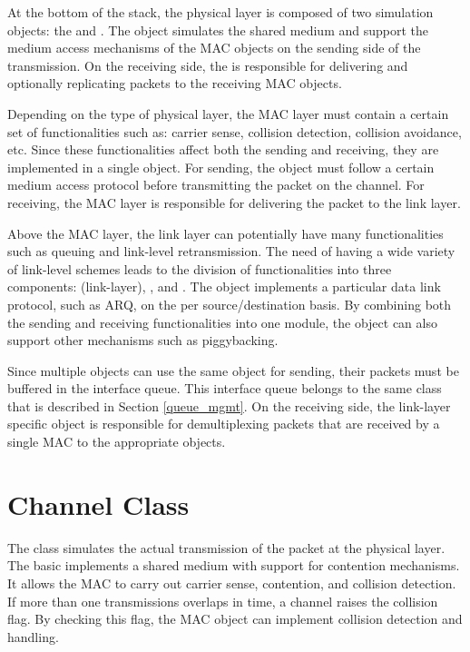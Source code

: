 At the bottom of the stack, the physical layer is composed of two
simulation objects: the  and .  The
 object simulates the shared medium and support the medium
access mechanisms of the MAC objects on the sending side of the
transmission.  On the receiving side, the  is
responsible for delivering and optionally replicating packets to the
receiving MAC objects.

Depending on the type of physical layer, the MAC layer must contain a
certain set of functionalities such as: carrier sense, collision
detection, collision avoidance, etc.  Since these functionalities affect
both the sending and receiving, they are implemented in a single
 object.  For sending, the  object must follow a certain
medium access protocol before transmitting the packet on the channel.
For receiving, the MAC layer is responsible for delivering the packet to
the link layer.

Above the MAC layer, the link layer can potentially have many
functionalities such as queuing and link-level retransmission.  The need
of having a wide variety of link-level schemes leads to the division of
functionalities into three components:  (link-layer),
, and .  The  object implements
a particular data link protocol, such as ARQ, on the per
source/destination basis.  By combining both the sending and receiving
functionalities into one module, the  object can also support
other mechanisms such as piggybacking.

Since multiple  objects can use the same  object for
sending, their packets must be buffered in the interface queue.  This
interface queue belongs to the same  class that is described
in Section \ref{queue_mgmt}.  On the receiving side, the link-layer
specific  object is responsible for demultiplexing
packets that are received by a single MAC to the appropriate 
objects.


\section{Channel Class}
\label{sec:channel}

The  class simulates the actual transmission of the packet
at the physical layer.  The basic  implements a shared
medium with support for contention mechanisms.  It allows the MAC to
carry out carrier sense, contention, and collision detection.  If more
than one transmissions overlaps in time, a channel raises the collision
flag.  By checking this flag, the MAC object can implement collision detection
and handling.

